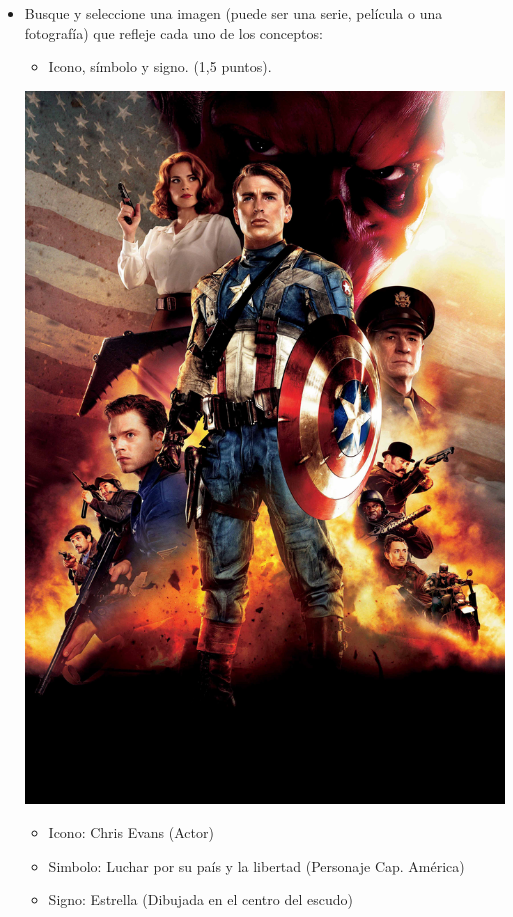 \documentclass[a4paper,12pt]{article}
\begin{document}
\begin{itemize}

\item Busque y seleccione una imagen (puede ser una serie, película o una fotografía) que refleje cada uno de los conceptos:

\begin{itemize}
\item Icono, símbolo y signo. (1,5 puntos).
\end{itemize}

\begin{center}
\par \includegraphics[scale=0.07]{capitanamerica.jpg} \par
\begin{itemize}
\item Icono: Chris Evans (Actor)
\item Simbolo: Luchar por su país y la libertad (Personaje Cap. América)
\item Signo: Estrella (Dibujada en el centro del escudo)
\end{itemize}
\end{center}


\end{itemize}
\end{document}
